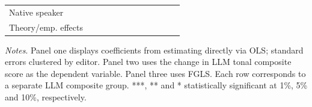 \begin{table}
\begin{threeparttable}
\begin{tabular}{p{3cm}S@{}S@{}S@{}S@{}S@{}S@{}S@{}S@{}S@{}S@{}S@{}}
            Native speaker                &               &           {}   &               &           {}   &               &           {}   &               &           {}   &               &               &               \\
            Theory/emp. effects           &               &           {}   &               &           {}   &               &           {}   &               &           {}   &               &               &               \\
            \bottomrule
        \end{tabular}
        \begin{tablenotes}
            \tiny
            \item \textit{Notes}. Panel one displays coefficients from estimating directly via OLS; standard errors clustered by editor. Panel two uses the change in LLM tonal composite score as the dependent variable. Panel three uses FGLS. Each row corresponds to a separate LLM composite group. ***, ** and * statistically significant at 1\%, 5\% and 10\%, respectively.
        \end{tablenotes}
    \end{threeparttable}

\end{table}

